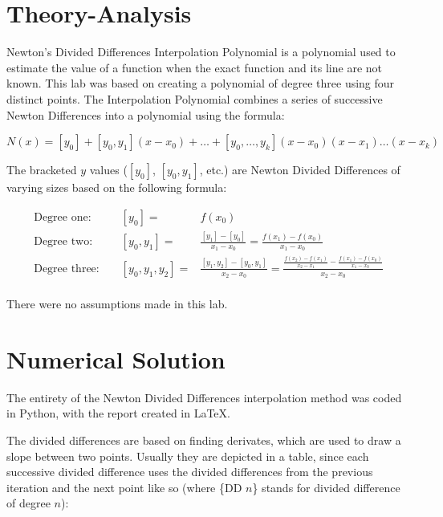 \documentclass[12pt, letterpaper]{article}
\begin{document}
\section{\label{sec:theory}Theory-Analysis}
	 Newton's Divided Differences Interpolation Polynomial is a polynomial used to estimate the value of a function when the exact function and its line are not known. This lab was based on creating a polynomial of degree three using four distinct points. The Interpolation Polynomial combines a series of successive Newton Differences into a polynomial using the formula:
	 
	 \begin{equation}N(x)=[y_0]+[y_0, y_1](x-x_0)+\ldots+[y_0, \ldots, y_k](x-x_0)(x-x_1)\ldots(x-x_k)\end{equation}
	 
	 The bracketed $y$ values ($[y_0]$, $[y_0, y_1]$, etc.) are Newton Divided Differences of varying sizes based on the following formula:
	 
	 \begin{align*}
	 	\text{Degree one: } && [y_0] = & f(x_0) \\
		\text{Degree two: } && [y_0, y_1] = & \frac{[y_1]-[y_0]}{x_1-x_0} = \frac{f(x_1)-f(x_0)}{x_1-x_0} \\
		\text{Degree three: } && [y_0, y_1, y_2] = & \frac{[y_1, y_2] - [y_0, y_1]}{x_2-x_0} = \frac{\frac{f(x_2)-f(x_1)}{x_2-x_1} - \frac{f(x_1)-f(x_0)}{x_1-x_0}}{x_2-x_0} \\
	\end{align*}
	
	There were no assumptions made in this lab.

	 
\section{\label{solution}Numerical Solution}
	The entirety of the Newton Divided Differences interpolation method was coded in Python, with the report created in \LaTeX{}.
	
	The divided differences are based on finding derivates, which are used to draw a slope between two points. Usually they are depicted in a table, since each successive divided difference uses the divided differences from the previous iteration and the next point like so (where \{DD $n$\} stands for divided difference of degree $n$):
	
\end{document}
